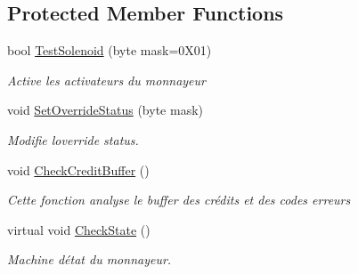 \subsection*{Protected Member Functions}
\begin{DoxyCompactItemize}
\item 
bool \mbox{\hyperlink{class_device_library_1_1_c_coin_validator_aca5a7f6d4805b9cd2df7b4d4fbdd0686}{Test\+Solenoid}} (byte mask=0\+X01)
\begin{DoxyCompactList}\small\item\em Active les activateurs du monnayeur \end{DoxyCompactList}\item 
void \mbox{\hyperlink{class_device_library_1_1_c_coin_validator_a941fe54c9299c2f3d78f865a3c7dc720}{Set\+Override\+Status}} (byte mask)
\begin{DoxyCompactList}\small\item\em Modifie l\textquotesingle{}override status. \end{DoxyCompactList}\item 
void \mbox{\hyperlink{class_device_library_1_1_c_coin_validator_ac3b462f2745990be15e78aef12ceb0ce}{Check\+Credit\+Buffer}} ()
\begin{DoxyCompactList}\small\item\em Cette fonction analyse le buffer des crédits et des codes erreurs \end{DoxyCompactList}\item 
virtual void \mbox{\hyperlink{class_device_library_1_1_c_coin_validator_ad5060d28baf7c2abedc788c6bcdcb02d}{Check\+State}} ()
\begin{DoxyCompactList}\small\item\em Machine d\textquotesingle{}état du monnayeur. \end{DoxyCompactList}\end{DoxyCompactItemize}
